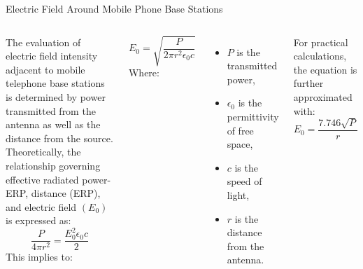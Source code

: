 \documentclass[7pt, aspectratio=169]{beamer}
\begin{document}
\begin{frame}{Electric Field Around Mobile Phone Base Stations}

\begin{columns}
     The evaluation of electric field intensity adjacent to mobile telephone base stations is determined by power transmitted from the antenna as well as the distance from the source. Theoretically, the relationship governing effective radiated power-ERP, distance (ERP), and electric field \((E_0)\) is expressed as\autocite{kumar2011effect}:
    \[
        \frac{P}{4 \pi r^2} = \frac{E_0^2 \epsilon_0 c}{2}
    \]
        This implies to:

    \[
        E_0 = \sqrt{\frac{P}{2 \pi r^2 \epsilon_0 c}}
    \]
    Where:
    \begin{itemize}
        \item \(P\) is the transmitted power,
        \item \( \epsilon_0 \) is the permittivity of free space,
        \item \(c\) is the speed of light,
        \item \(r\) is the distance from the antenna.
    \end{itemize}

    For practical calculations, the equation is further approximated with:
    \[
        E_0 = \frac{7.746 \sqrt{P}}{r}
    \]

\end{columns}


    
\end{frame}
\end{document}
